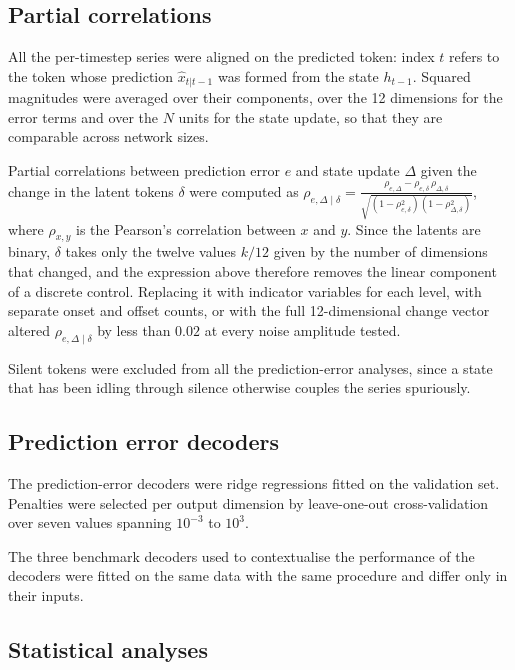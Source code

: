   \subsection*{Partial correlations}

    All the per-timestep series were aligned on the predicted token: index $t$ refers to the token whose prediction $\hat{x}_{t|t-1}$ was formed from the state $h_{t-1}$. Squared magnitudes were averaged over their components, over the 12 dimensions for the error terms and over the $N$ units for the state update, so that they are comparable across network sizes.

    Partial correlations between prediction error $e$ and state update $\Delta$ given the change in the latent tokens $\delta$ were computed as $\rho_{e, \Delta \mid \delta} = \frac{\rho_{e,\Delta} - \rho_{e,\delta} \, \rho_{\Delta, \delta}}{\sqrt{(1 - \rho_{e,\delta}^{2})(1 - \rho_{\Delta, \delta}^{2})}}$, where $\rho_{x,y}$ is the Pearson's correlation between $x$ and $y$. Since the latents are binary, $\delta$ takes only the twelve values $k/12$ given by the number of dimensions that changed, and the expression above therefore removes the linear component of a discrete control. Replacing it with indicator variables for each level, with separate onset and offset counts, or with the full 12-dimensional change vector altered $\rho_{e, \Delta \mid \delta}$ by less than $0.02$ at every noise amplitude tested.

    Silent tokens were excluded from all the prediction-error analyses, since a state that has been idling through silence otherwise couples the series spuriously.

  \subsection*{Prediction error decoders}

    The prediction-error decoders were ridge regressions fitted on the validation set. Penalties were selected per output dimension by leave-one-out cross-validation over seven values spanning $10^{-3}$ to $10^{3}$. 

    The three benchmark decoders used to contextualise the performance of the decoders were fitted on the same data with the same procedure and differ only in their inputs.

  \subsection*{Statistical analyses}


